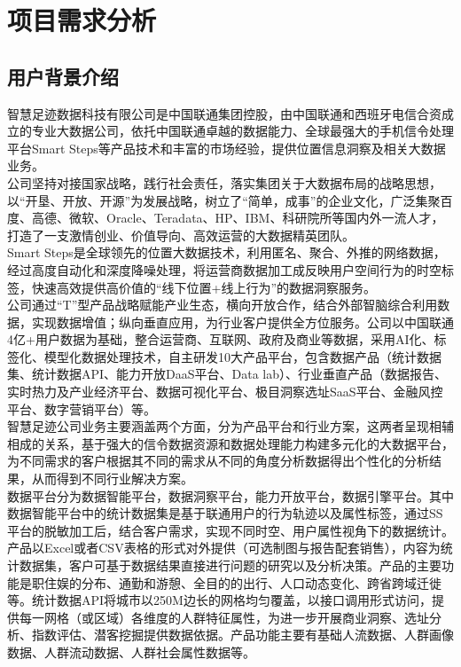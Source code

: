 
\chapter{项目需求分析} %

\label{Chapter2} 
\section{用户背景介绍}
智慧足迹数据科技有限公司是中国联通集团控股，由中国联通和西班牙电信合资成立的专业大数据公司，依托中国联通卓越的数据能力、全球最强大的手机信令处理平台Smart Steps等产品技术和丰富的市场经验，提供位置信息洞察及相关大数据业务。\\
\indent 公司坚持对接国家战略，践行社会责任，落实集团关于大数据布局的战略思想，以“开垦、开放、开源”为发展战略，树立了“简单，成事”的企业文化，广泛集聚百度、高德、微软、Oracle、Teradata、HP、IBM、科研院所等国内外一流人才，打造了一支激情创业、价值导向、高效运营的大数据精英团队。\\
\indent Smart Steps是全球领先的位置大数据技术，利用匿名、聚合、外推的网络数据，经过高度自动化和深度降噪处理，将运营商数据加工成反映用户空间行为的时空标签，快速高效提供高价值的“线下位置+线上行为”的数据洞察服务。\\
\indent 公司通过“T”型产品战略赋能产业生态，横向开放合作，结合外部智脑综合利用数据，实现数据增值；纵向垂直应用，为行业客户提供全方位服务。公司以中国联通4亿+用户数据为基础，整合运营商、互联网、政府及商业等数据，采用AI化、标签化、模型化数据处理技术，自主研发10大产品平台，包含数据产品（统计数据集、统计数据API、能力开放DaaS平台、Data lab）、行业垂直产品（数据报告、实时热力及产业经济平台、数据可视化平台、极目洞察选址SaaS平台、金融风控平台、数字营销平台）等。\\
\indent 智慧足迹公司业务主要涵盖两个方面，分为产品平台和行业方案，这两者呈现相辅相成的关系，基于强大的信令数据资源和数据处理能力构建多元化的大数据平台，为不同需求的客户根据其不同的需求从不同的角度分析数据得出个性化的分析结果，从而得到不同行业解决方案。\\
\indent 数据平台分为数据智能平台，数据洞察平台，能力开放平台，数据引擎平台。其中数据智能平台中的统计数据集是基于联通用户的行为轨迹以及属性标签，通过SS平台的脱敏加工后，结合客户需求，实现不同时空、用户属性视角下的数据统计。产品以Excel或者CSV表格的形式对外提供（可选制图与报告配套销售），内容为统计数据集，客户可基于数据结果直接进行问题的研究以及分析决策。产品的主要功能是职住娱的分布、通勤和游憩、全目的的出行、人口动态变化、跨省跨域迁徙等。统计数据API将城市以250M边长的网格均匀覆盖，以接口调用形式访问，提供每一网格（或区域）各维度的人群特征属性，为进一步开展商业洞察、选址分析、指数评估、潜客挖掘提供数据依据。产品功能主要有基础人流数据、人群画像数据、人群流动数据、人群社会属性数据等。\\
